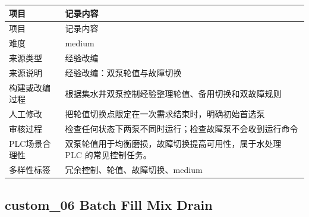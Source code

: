 \begin{longtable}{L{3.0cm}L{10.3cm}}

\toprule

项目 & 记录内容\\

\midrule

\endfirsthead

\toprule

项目 & 记录内容\\

\midrule

\endhead

难度 & medium\\

来源类型 & 经验改编\\

来源说明 & 经验改编：双泵轮值与故障切换\\

构建或改编过程 & 根据集水井双泵控制经验整理轮值、备用切换和双故障规则\\

人工修改 & 把轮值切换点限定在一次需求结束时，明确初始首选泵\\

审核过程 & 检查任何状态下两泵不同时运行；检查故障泵不会收到运行命令\\

PLC场景合理性 & 双泵轮值用于均衡磨损，故障切换提高可用性，属于水处理 PLC 的常见控制任务。\\

多样性标签 & 冗余控制、轮值、故障切换、medium\\

\bottomrule

\end{longtable}

\subsection{{\ttfamily custom\_06} Batch Fill Mix Drain}

